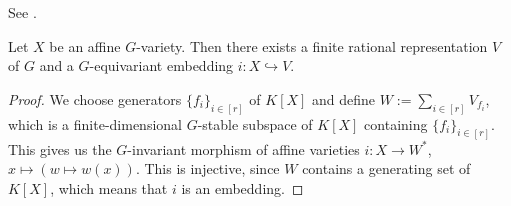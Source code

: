 \begin{lemma}\label{emb}
  See \cite[A1.9]{DK15}.
  
  Let $X$ be an affine $G$-variety.
  Then there exists a finite rational representation $V$ of $G$ and a $G$-equivariant embedding $i \colon X \hookrightarrow V$.
\end{lemma}



\begin{proof}
  We choose generators $\{f_i\}_{i \in [r]}$ of $K[X]$ and define $W := \sum_{i \in [r]} V_{f_i}$, which is a finite-dimensional $G$-stable subspace of $K[X]$ containing $\{f_i\}_{i \in [r]}$.
  This gives us the $G$-invariant morphism of affine varieties $i \colon X \longrightarrow W^\ast$, $x \mapsto (w \mapsto w(x))$.
  This is injective, since $W$ contains a generating set of $K[X]$, which means that $i$ is an embedding.
\end{proof}

